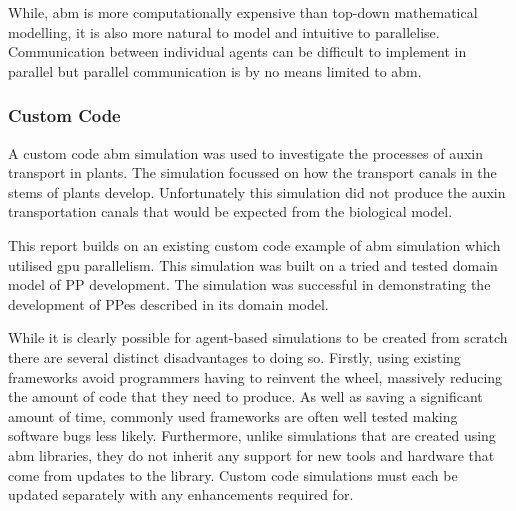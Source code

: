\documentclass{UoYCSproject}
\begin{document}
While, \acrlong{abm} is more computationally expensive than top-down mathematical modelling, it is also more natural to model and intuitive to parallelise\cite{flame_simulation}.
Communication between individual agents can be difficult to implement in parallel but parallel communication is by no means limited to \gls{abm}.

\subsubsection{Custom Code}
A custom code \gls{abm} simulation was used to investigate the processes of auxin transport in plants.\cite{stepney_abm}
The simulation focussed on how the transport canals in the stems of plants develop.
Unfortunately this simulation did not produce the auxin transportation canals that would be expected from the biological model.

This report builds on an existing custom code example of \gls{abm} simulation which utilised \gls{gpu} parallelism.\cite{phil_diss}
This simulation was built on a tried and tested domain model of \gls{PP} development\cite{kieran_thesis}.
The simulation was successful in demonstrating the development of \gls{PP}es described in its domain model.

While it is clearly possible for agent-based simulations to be created from scratch there are several distinct disadvantages to doing so.
Firstly, using existing frameworks avoid programmers having to reinvent the wheel, massively reducing the amount of code that they need to produce.
As well as saving a significant amount of time, commonly used frameworks are often well tested making software bugs less likely.
Furthermore, unlike simulations that are created using \gls{abm} libraries, they do not inherit any support for new tools and hardware that come from updates to the library.
Custom code simulations must each be updated separately with any enhancements required for.
\end{document}

